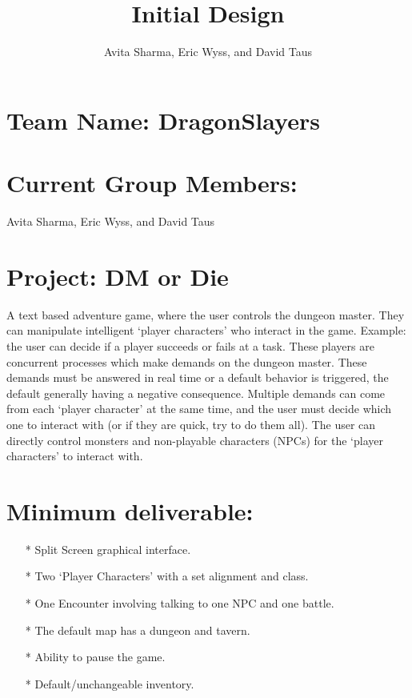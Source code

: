 \documentclass{article}
\author{Avita Sharma, Eric Wyss, and David Taus}
\title{\textbf{Initial Design}}
\date{}
\theoremstyle{definition}
\begin{document}
\maketitle
\section*{Team Name: DragonSlayers}
\section*{Current Group Members:}
 Avita Sharma, Eric Wyss, and David Taus
\section*{Project: DM or Die}
A text based adventure game, where the user controls the dungeon master. They can 
manipulate intelligent `player characters' who interact in the game. Example: the
user can decide if a player succeeds or fails at a task. These players are 
concurrent processes which make demands on the dungeon master. These demands
must be answered in real time or a default behavior is triggered, the default
generally having a negative consequence. Multiple demands can come from each 
`player character' at the same time, and the user must decide which one to interact 
with (or if they are quick, try to do them all). The user can directly control
monsters and non-playable characters (NPCs) for the `player characters' to interact 
with.
\section*{Minimum deliverable:}
\begin{enumerate}
\item [*] Split Screen graphical interface.
\item [*] Two `Player Characters' with a set alignment and class.
\item [*] One Encounter involving talking to one NPC and one battle. 
\item [*] The default map has a dungeon and tavern.
\item [*] Ability to pause the game.
\item [*] Default/unchangeable inventory.
\end{enumerate}
\end{document}
